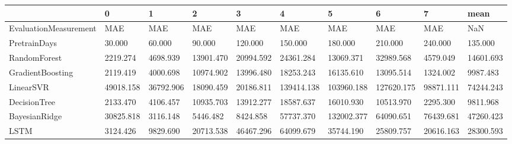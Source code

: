 \begin{tabular}{llllllllll}
\toprule
{} &         0 &         1 &         2 &         3 &          4 &          5 &          6 &         7 &      mean \\
\midrule
EvaluationMeasurement &       MAE &       MAE &       MAE &       MAE &        MAE &        MAE &        MAE &       MAE &       NaN \\
PretrainDays          &    30.000 &    60.000 &    90.000 &   120.000 &    150.000 &    180.000 &    210.000 &   240.000 &   135.000 \\
RandomForest          &  2219.274 &  4698.939 & 13901.470 & 20994.592 &  24361.284 &  13069.371 &  32989.568 &  4579.049 & 14601.693 \\
GradientBoosting      &  2119.419 &  4000.698 & 10974.902 & 13996.480 &  18253.243 &  16135.610 &  13095.514 &  1324.002 &  9987.483 \\
LinearSVR             & 49018.158 & 36792.906 & 18090.459 & 20186.811 & 139414.138 & 103960.188 & 127620.175 & 98871.111 & 74244.243 \\
DecisionTree          &  2133.470 &  4106.457 & 10935.703 & 13912.277 &  18587.637 &  16010.930 &  10513.970 &  2295.300 &  9811.968 \\
BayesianRidge         & 30825.818 &  3116.148 &  5446.482 &  8424.858 &  57737.370 & 132002.377 &  64090.651 & 76439.681 & 47260.423 \\
LSTM                  &  3124.426 &  9829.690 & 20713.538 & 46467.296 &  64099.679 &  35744.190 &  25809.757 & 20616.163 & 28300.593 \\
\bottomrule
\end{tabular}

